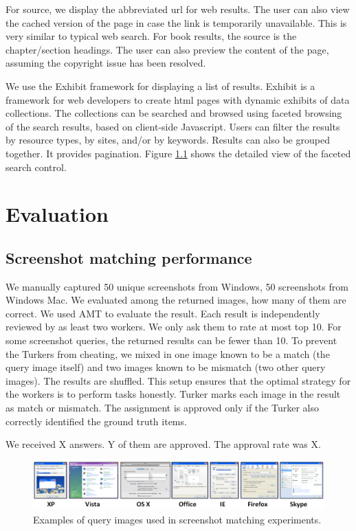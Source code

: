 \documentclass{www2010-submission}
\begin{document}
For source, we display the abbreviated url for web results. The
user can also view the cached version of the page in case the link
is temporarily unavailable. This is very similar to typical web
search. For book results, the source is the chapter/section
headings. The user can also preview the content of the page,
assuming the copyright issue has been resolved.

We use the Exhibit framework for displaying a list of results.
Exhibit is a framework for web developers to create html pages
with dynamic exhibits of data collections. The collections can be
searched and browsed using faceted browsing of the search results,
based on client-side Javascript. Users can filter the results by
resource types, by sites, and/or by keywords. Results can also be
grouped together. It provides pagination. Figure \ref{} shows the
detailed view of the faceted search control.

\section{Evaluation}


\subsection{Screenshot matching performance}

We manually captured 50 unique screenshots from Windows, 50
screenshots from Windows Mac. We evaluated among the returned
images, how many of them are correct. We used AMT to evaluate the
result. Each result is independently reviewed by as least two
workers. We only ask them to rate at most top 10. For some
screenshot queries, the returned results can be fewer than 10. To
prevent the Turkers from cheating, we mixed in one image known to
be a match (the query image itself) and two images known to be
mismatch (two other query images). The results are shuffled. This
setup ensures that the optimal strategy for the workers is to
perform tasks honestly. Turker marks each image in the result as
match or mismatch. The assignment is approved only if the Turker
also correctly identified the ground truth items.

We received X answers. Y of them are approved. The approval rate
was X.

\begin{figure}
\includegraphics[width=2\columnwidth]{figure/query_examples.png}
\caption{Examples of query images used in screenshot matching
experiments.}
\end{figure}
\end{document}

